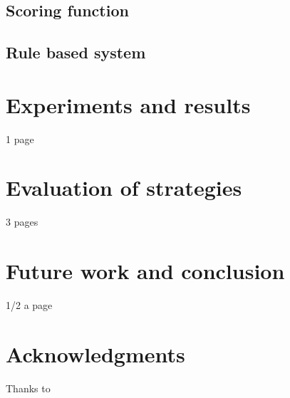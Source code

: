\documentclass[11pt]{article}
\begin{document}
\subsection{Scoring function}
\subsection{Rule based system}

\section{Experiments and results}
1 page

\section{Evaluation of strategies}
3 pages

\section{Future work and conclusion}
1/2 a page

\section*{Acknowledgments}

Thanks to



\end{document}

